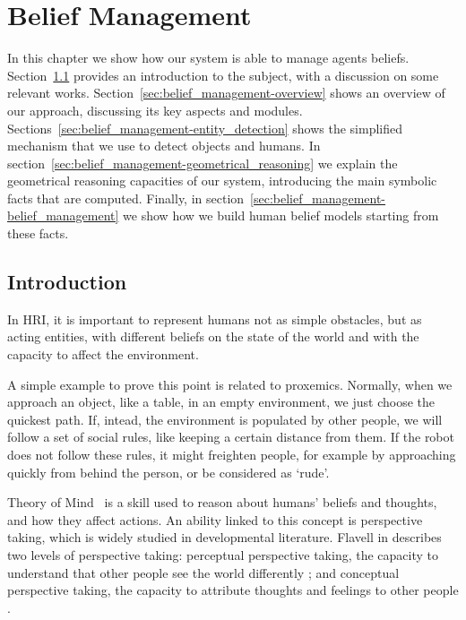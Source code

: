 
\chapter{Belief Management} %

\label{chapter:belief_management} %


In this chapter we show how our system is able to manage agents beliefs. Section~\ref{sec:belief_management-intro} provides an introduction to the subject, with a discussion on some relevant works. Section~\ref{sec:belief_management-overview} shows an overview of our approach, discussing its key aspects and modules. Sections~\ref{sec:belief_management-entity_detection}  shows the simplified mechanism that we use to detect objects and humans. In section~\ref{sec:belief_management-geometrical_reasoning} we explain the geometrical reasoning capacities of our system, introducing the main symbolic facts that are computed. Finally, in section~\ref{sec:belief_management-belief_management} we show how we build human belief models starting from these facts.

\section{Introduction}
\label{sec:belief_management-intro}

In HRI, it is important to represent humans not as simple obstacles, but as acting entities, with different beliefs on the state of the world and with the capacity to affect the environment. 

A simple example to prove this point is related to proxemics. Normally, when we approach an object, like a table, in an empty environment, we just choose the quickest path. If, intead, the environment is populated by other people, we will follow a set of social rules, like keeping a certain distance from them. If the robot does not follow these rules, it might freighten people, for example by approaching quickly from behind the person, or be considered as `rude'.


Theory of Mind~\citep{premack1978does} is a skill used to reason about humans' beliefs and thoughts, and how they affect actions. An ability linked to this concept is perspective taking, which is widely studied in developmental literature.  Flavell in \cite{flavell1977development} describes two levels of perspective taking: 
perceptual perspective taking, the capacity to understand that other people see the world differently \citep{Tversky1999}; and conceptual perspective taking, the capacity to attribute thoughts and feelings to other people \citep{Baron1985}. 

